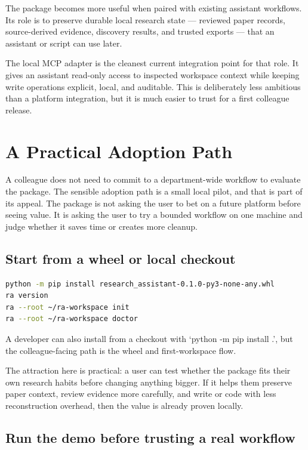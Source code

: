 \documentclass[11pt,a4paper,openany]{book}
\begin{document}
The package becomes more useful when paired with existing assistant workflows.
Its role is to preserve durable local research state --- reviewed paper records,
source-derived evidence, discovery results, and trusted exports --- that an
assistant or script can use later.

The local MCP adapter is the cleanest current integration point for that role.
It gives an assistant read-only access to inspected workspace context while
keeping write operations explicit, local, and auditable. This is deliberately
less ambitious than a platform integration, but it is much easier to trust for a
first colleague release.

\chapter{A Practical Adoption Path}

A colleague does not need to commit to a department-wide workflow to evaluate the
package. The sensible adoption path is a small local pilot, and that is part of
its appeal. The package is not asking the user to bet on a future platform before
seeing value. It is asking the user to try a bounded workflow on one machine and
judge whether it saves time or creates more cleanup.

\section{Start from a wheel or local checkout}

\begin{lstlisting}[language=bash]
python -m pip install research_assistant-0.1.0-py3-none-any.whl
ra version
ra --root ~/ra-workspace init
ra --root ~/ra-workspace doctor
\end{lstlisting}

A developer can also install from a checkout with `python -m pip install .', but
the colleague-facing path is the wheel and first-workspace flow.

The attraction here is practical: a user can test whether the package fits their
own research habits before changing anything bigger. If it helps them preserve
paper context, review evidence more carefully, and write or code with less
reconstruction overhead, then the value is already proven locally.

\section{Run the demo before trusting a real workflow}
\end{document}
